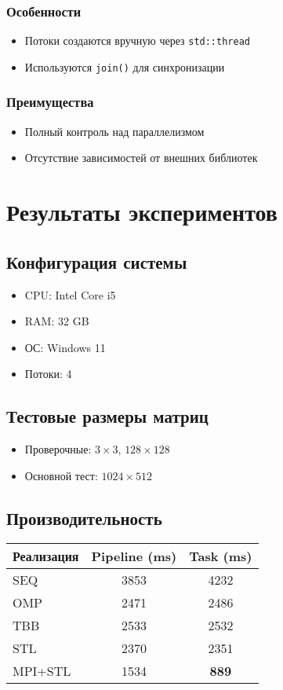 \documentclass[12pt]{article}
\begin{document}
\subsubsection*{Особенности}
\begin{itemize}
  \item Потоки создаются вручную через \texttt{std::thread}
  \item Используются \texttt{join()} для синхронизации
\end{itemize}

\subsubsection*{Преимущества}
\begin{itemize}
  \item Полный контроль над параллелизмом
  \item Отсутствие зависимостей от внешних библиотек
\end{itemize}

\section{Результаты экспериментов}
\subsection*{Конфигурация системы}
\begin{itemize}
  \item CPU: Intel Core i5
  \item RAM: 32 GB
  \item ОС: Windows 11
  \item Потоки: 4
\end{itemize}

\subsection*{Тестовые размеры матриц}
\begin{itemize}
  \item Проверочные: $3 \times 3$, $128 \times 128$
  \item Основной тест: $1024 \times 512$
\end{itemize}

\subsection*{Производительность}
\begin{tabular}{|l|c|c|}
\hline
\textbf{Реализация} & \textbf{Pipeline (ms)} & \textbf{Task (ms)} \\
\hline
SEQ       & 3853 & 4232 \\
OMP       & 2471 & 2486 \\
TBB       & 2533 & 2532 \\
STL       & 2370 & 2351 \\
MPI+STL   & 1534 & \textbf{889} \\
\hline
\end{tabular}
\end{document}
